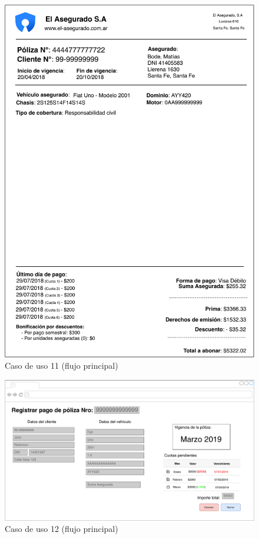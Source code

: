 \documentclass[12pt]{article}
\begin{document}
\vfill
\begin{figure}[h!]
\includegraphics[width=\textwidth]{CU11/CU-112.pdf}
\caption{Caso de uso 11 (flujo principal)}
\end{figure}
\vfill


\vfill
\begin{figure}[h!]
\includegraphics[width=\textwidth]{CU12/CU-121.pdf}
\caption{Caso de uso 12 (flujo principal)}
\end{figure}
\vfill
\end{document}
